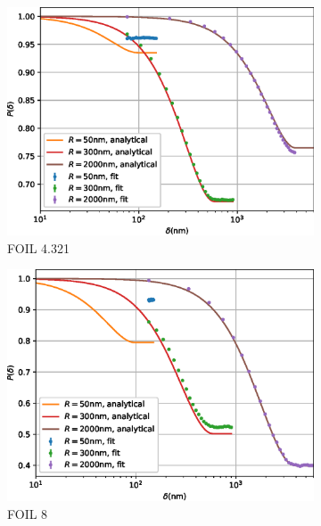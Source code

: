 \begin{figure}[p]
	\centering
	\begin{subfigure}[b]{0.45\textwidth}
		\centering
		\includegraphics[width=\textwidth]{simulation-plot-gauss-FOIL-4.321}
		\caption{FOIL 4.321}
		\label{fig:simulation-plot-gauss-FOIL-4.321}
	\end{subfigure}
	\hfill
	\begin{subfigure}[b]{0.45\textwidth}
		\centering
		\includegraphics[width=\textwidth]{simulation-plot-gauss-FOIL-8}
		\caption{FOIL 8}
		\label{fig:simulation-plot-gauss-FOIL-8}
	\end{subfigure}
	\centering
	\begin{subfigure}[b]{0.45\textwidth}
		\centering

\end{subfigure}
\end{figure}
